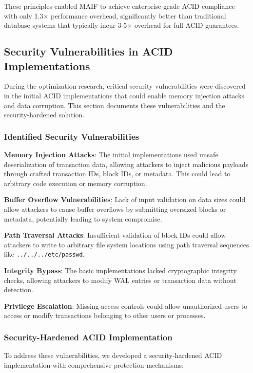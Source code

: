 \documentclass[conference]{IEEEtran}
\begin{document}
\begin{itemize}[leftmargin=*]
These principles enabled MAIF to achieve enterprise-grade ACID compliance with only 1.3× performance overhead, significantly better than traditional database systems that typically incur 3-5× overhead for full ACID guarantees.

\subsection{Security Vulnerabilities in ACID Implementations}

During the optimization research, critical security vulnerabilities were discovered in the initial ACID implementations that could enable memory injection attacks and data corruption. This section documents these vulnerabilities and the security-hardened solution.

\subsubsection{Identified Security Vulnerabilities}

\textbf{Memory Injection Attacks}:
The initial implementations used unsafe deserialization of transaction data, allowing attackers to inject malicious payloads through crafted transaction IDs, block IDs, or metadata. This could lead to arbitrary code execution or memory corruption.

\textbf{Buffer Overflow Vulnerabilities}:
Lack of input validation on data sizes could allow attackers to cause buffer overflows by submitting oversized blocks or metadata, potentially leading to system compromise.

\textbf{Path Traversal Attacks}:
Insufficient validation of block IDs could allow attackers to write to arbitrary file system locations using path traversal sequences like \texttt{../../../etc/passwd}.

\textbf{Integrity Bypass}:
The basic implementations lacked cryptographic integrity checks, allowing attackers to modify WAL entries or transaction data without detection.

\textbf{Privilege Escalation}:
Missing access controls could allow unauthorized users to access or modify transactions belonging to other users or processes.

\subsubsection{Security-Hardened ACID Implementation}

To address these vulnerabilities, we developed a security-hardened ACID implementation with comprehensive protection mechanisms:


\end{itemize}
\end{document}
